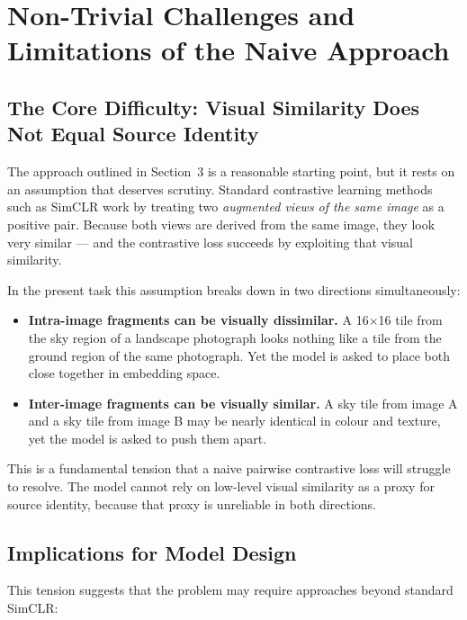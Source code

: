 \documentclass[12pt, a4paper]{article}
\begin{document}
\section{Non-Trivial Challenges and Limitations of the Naive Approach}

\subsection{The Core Difficulty: Visual Similarity Does Not Equal Source Identity}

The approach outlined in Section~3 is a reasonable starting point, but it rests on an
assumption that deserves scrutiny. Standard contrastive learning methods such as SimCLR
\parencite{simclr2020} work by treating two \emph{augmented views of the same image} as
a positive pair. Because both views are derived from the same image, they look very
similar — and the contrastive loss succeeds by exploiting that visual similarity.

In the present task this assumption breaks down in two directions simultaneously:

\begin{itemize}
    \item \textbf{Intra-image fragments can be visually dissimilar.} A 16$\times$16 tile
          from the sky region of a landscape photograph looks nothing like a tile from the
          ground region of the same photograph. Yet the model is asked to place both close
          together in embedding space.
    \item \textbf{Inter-image fragments can be visually similar.} A sky tile from image A
          and a sky tile from image B may be nearly identical in colour and texture, yet
          the model is asked to push them apart.
\end{itemize}

This is a fundamental tension that a naive pairwise contrastive loss will struggle to
resolve. The model cannot rely on low-level visual similarity as a proxy for source
identity, because that proxy is unreliable in both directions.

\subsection{Implications for Model Design}

This tension suggests that the problem may require approaches beyond standard SimCLR:
\end{document}

